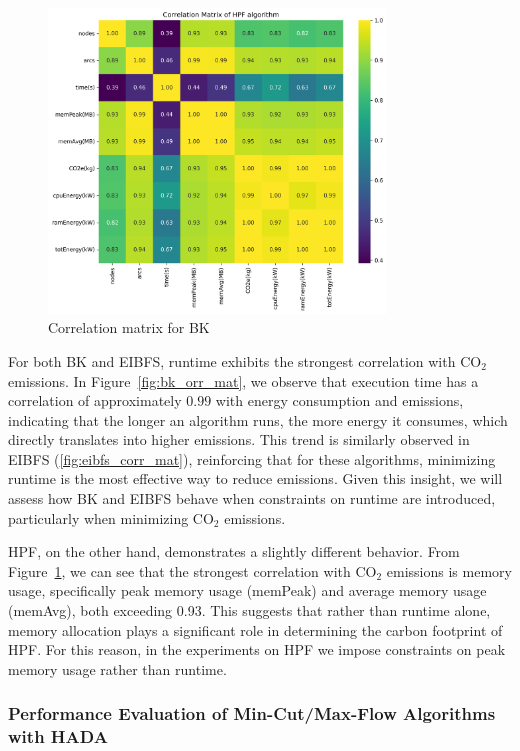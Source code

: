 \documentclass[a4paper,singleside,12pt]{report} %
\begin{document}
\begin{figure}[h!]
    \centering
    \includegraphics[width=0.8\textwidth]{imgs/hpf_corr_mat.png}
    \caption{Correlation matrix for BK}
    \label{fig:hpf_flow_corr_mat}
\end{figure}

For both BK and EIBFS, runtime exhibits the strongest correlation with CO$_2$ emissions. In Figure~\ref{fig:bk_orr_mat}, we observe that execution time has a correlation of approximately
$0.99$ with energy consumption and emissions, indicating that the longer an algorithm runs, the more energy it consumes, which directly translates into higher emissions. This trend 
is similarly observed in EIBFS (\ref{fig:eibfs_corr_mat}), reinforcing that for these algorithms, minimizing runtime is the most effective way to reduce emissions. Given this insight, 
we will assess how BK and EIBFS behave when constraints on runtime are introduced, particularly when minimizing CO$_2$ emissions.

HPF, on the other hand, demonstrates a slightly different behavior. From Figure~\ref{fig:hpf_flow_corr_mat}, we can see that the strongest correlation with CO$_2$ emissions is memory usage, 
specifically peak memory usage (memPeak) and average memory usage (memAvg), both exceeding 0.93. This suggests that rather than runtime alone, memory allocation plays a significant 
role in determining the carbon footprint of HPF. For this reason, in the experiments on HPF we impose constraints on peak memory usage rather than runtime.

\subsubsection{Performance Evaluation of Min-Cut/Max-Flow Algorithms with HADA}
\end{document}
